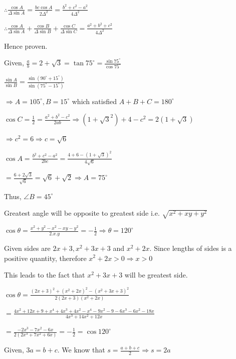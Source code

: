   $\therefore \frac{\cos A}{\Delta\sin A} = \frac{bc\cos A}{2\Delta^2} = \frac{b^2 + c^2 - a^2}{4\Delta^2}$

  $\therefore \frac{\cos A}{\Delta\sin A} + \frac{\cos B}{\Delta\sin B} + \frac{\cos
  C}{\Delta\sin C} = \frac{a^2 + b^2 + c^2}{4\Delta^2}$

  Hence proven.

\item Given, $\frac{a}{b} = 2 + \sqrt{3} = \tan75^\circ = \frac{\sin75^\circ}{\cos75^\circ}$

  $\frac{\sin A}{\sin B} = \frac{\sin(90^\circ + 15^\circ)}{\sin(75^\circ - 15^\circ)}$

  $\Rightarrow A = 105^\circ, B= 15^\circ$ which satisfied $A + B + C = 180^\circ$

\item $\cos C = \frac{1}{2} = \frac{a^2 + b^2 - c^2}{2ab} \Rightarrow (1 + \sqrt{3}^2) + 4 - c^2 = 2(1 + \sqrt{3})$

  $\Rightarrow c^2 = 6 \Rightarrow c = \sqrt{6}$

  $\cos A = \frac{b^2 + c^2 - a^2}{2bc} = \frac{4 + 6 - (1 + \sqrt{3})^2}{4\sqrt{6}}$

  $= \frac{6 + 2\sqrt{3}}{\sqrt{6}} = \sqrt{6} + \sqrt{2} \Rightarrow A = 75^\circ$

  Thus, $\angle B = 45^\circ$

\item Greatest angle will be opposite to greatest side i.e. $\sqrt{x^2 + xy + y^2}$

  $\cos\theta = \frac{x^2 + y^2 - x^2 - xy - y^2}{2.x.y} = -\frac{1}{2} \Rightarrow \theta = 120^\circ$

\item Given sides are $2x + 3, x^2 + 3x + 3$ and $x^2 + 2x.$ Since lengths of sides is a positive quantity, therefore
  $x^2 + 2x > 0 \Rightarrow x > 0$

  This leads to the fact that $x^2 + 3x + 3$ will be greatest side.

  $\cos\theta = \frac{(2x + 3)^2 + (x^2 + 2x)^2 - (x^2 + 3x + 3)^2}{2(2x + 3)(x^2 + 2x)}$

  $= \frac{4x^2 + 12x + 9 + x^4 + 4x^3 + 4x^2 - x^4 - 9x^2 - 9 - 6x^3 - 6x^2 - 18x}{4x^3 + 14x^2 + 12x}$

  $= \frac{-2x^3 -7x^2 - 6x}{2(2x^3 + 7x^2 + 6x)} = -\frac{1}{2} = \cos120^\circ$

\item Given, $3a = b + c.$ We know that $s = \frac{a + b + c}{2} \Rightarrow s = 2a$

